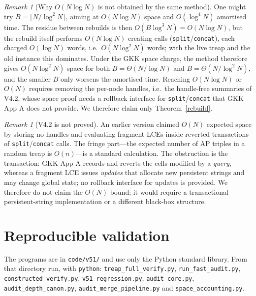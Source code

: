 ﻿\documentclass[11pt]{article}
\theoremstyle{plain}
\theoremstyle{remark}
\newtheorem{remark}[theorem]{Remark}
\begin{document}
\begin{remark}[Why $O(N\log N)$ is not obtained by the same method]\label{noNlogN}
One might try $B=\lceil N/\log^2N\rceil$, aiming at $O(N\log N)$ space and $O(\log^4N)$ amortised time. The residue between rebuilds is then $O(B\log^3N)=O(N\log N)$, but the rebuild itself performs $O(N\log N)$ creating calls (\texttt{split}/\texttt{concat}), each charged $O(\log N)$ words, i.e.\ $O(N\log^2N)$ words; with the live treap and the old instance this dominates. Under the GKK space charge, the method therefore gives $O(N\log^2N)$ space for both $B=\Theta(N/\log N)$ and $B=\Theta(N/\log^2N)$, and the smaller $B$ only worsens the amortised time. Reaching $O(N\log N)$ or $O(N)$ requires removing the per-node handles, i.e.\ the handle-free summaries of V4.2, whose space proof needs a rollback interface for \texttt{split}/\texttt{concat} that GKK App A does not provide. We therefore claim only Theorem~\ref{rebuild}.
\end{remark}

\begin{remark}[V4.2 is not proved]\label{v42}
An earlier version claimed $O(N)$ expected space by storing no handles and evaluating fragment LCEs inside reverted transactions of \texttt{split}/\texttt{concat} calls. The fringe part---the expected number of AP triples in a random treap is $O(n)$---is a standard calculation. The obstruction is the transaction: GKK App A records and reverts the cells modified by a \emph{query}, whereas a fragment LCE issues \emph{updates} that allocate new persistent strings and may change global state; no rollback interface for updates is provided. We therefore do not claim the $O(N)$ bound; it would require a transactional persistent-string implementation or a different black-box structure.
\end{remark}

\section{Reproducible validation}\label{sec:valid}
\small
The programs are in \texttt{code/v51/} and use only the Python standard library. From that directory run, with \texttt{python}: \texttt{treap\_full\_verify.py}, \texttt{run\_fast\_audit.py}, \texttt{constructed\_verify.py}, \texttt{v51\_regression.py}, \texttt{audit\_core.py}, \texttt{audit\_depth\_canon.py}, \texttt{audit\_merge\_pipeline.py} and \texttt{space\_accounting.py}.
\end{document}
